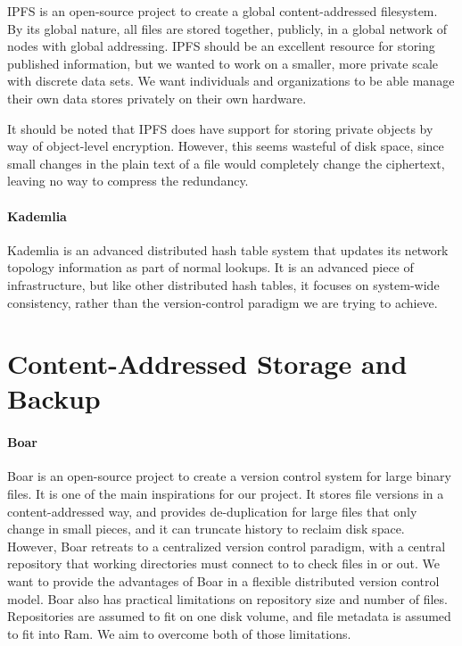 \documentclass[12pt,a4paper,two-side]{book}
\begin{document}
IPFS \cite{ipfs_github_main} is an open-source project to create a global
content-addressed filesystem. By its global nature, all files are stored
together, publicly, in a global network of nodes with global addressing. IPFS
should be an excellent resource for storing published information, but we wanted
to work on a smaller, more private scale with discrete data sets. We want
individuals and organizations to be able manage their own data stores privately
on their own hardware.

It should be noted that IPFS does have support for storing private objects by
way of object-level encryption. However, this seems wasteful of disk space,
since small changes in the plain text of a file would completely change the
ciphertext, leaving no way to compress the redundancy.


\paragraph{Kademlia}

Kademlia \cite{Maymounkov2002} is an advanced distributed hash table system that
updates its network topology information as part of normal lookups. It is an
advanced piece of infrastructure, but like other distributed hash tables, it
focuses on system-wide consistency, rather than the version-control paradigm we
are trying to achieve.


\section{Content-Addressed Storage and Backup}

\paragraph{Boar}

Boar \cite{boar_homepage} is an open-source project to create a version control
system for large binary files. It is one of the main inspirations for our
project. It stores file versions in a content-addressed way, and provides
de-duplication for large files that only change in small pieces, and it can
truncate history to reclaim disk space. However, Boar retreats to a centralized
version control paradigm, with a central repository that working directories
must connect to to check files in or out. We want to provide the advantages of
Boar in a flexible distributed version control model. Boar also has practical
limitations on repository size and number of files. Repositories are assumed to
fit on one disk volume, and file metadata is assumed to fit into Ram. We aim to
overcome both of those limitations.
\end{document}
